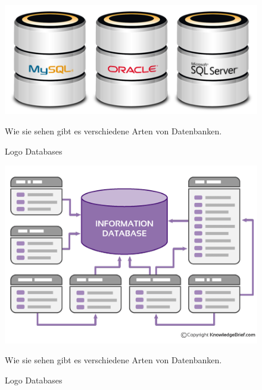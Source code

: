 \documentclass{article}
\begin{document}
\begin{figure}[ht]
    \centering
    \includegraphics[width=.5\linewidth]{database}
    \caption{Logo Databases}
    \label{fig:sub1}{Wie sie sehen gibt es verschiedene Arten von Datenbanken.}
    \end{figure}

    \begin{figure}[ht]
        \centering
        \includegraphics[width=.8\linewidth]{database1}
        \caption{Logo Databases}
        \label{fig:sub1}{Wie sie sehen gibt es verschiedene Arten von Datenbanken.}
        \end{figure}
%
%
%
%
%

\cleardoublepage
\end{document}
